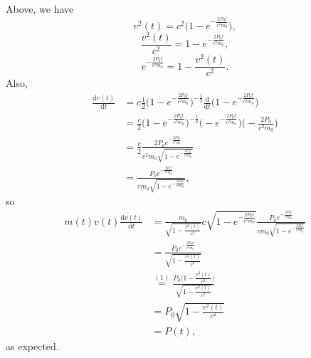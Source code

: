 \documentclass[12pt]{article}
\newcommand{\dd}{\mathrm{d}}
\begin{document}
Above, we have
\[
v^2(t) = c^2\Bigg( 1 - e^{-\frac{2P_0 t}{c^2 m_0}} \Bigg),
\]
\[
\frac{v^2(t)}{c^2} = 1 - e^{-\frac{2P_0 t}{c^2 m_0}}, 
\]
\begin{equation}
e^{-\frac{2P_0 t}{c^2 m_0}} = 1 - \frac{v^2(t)}{c^2}.
\end{equation}
Also,
\begin{align*}
\frac{\dd v(t)}{\dd t} &= c\frac{1}{2} \Bigg( 1 - e^{-\frac{2P_0 t}{c^2 m_0}}\Bigg)^{-\frac{1}{2}} \frac{\dd}{\dd t}\Bigg( 1 - e^{-\frac{2P_0 t}{c^2 m_0}}\Bigg) \\
							  &= \frac{c}{2} \Bigg( 1 - e^{-\frac{2P_0 t}{c^2 m_0}}\Bigg)^{-\frac{1}{2}} \Bigg( -e^{-\frac{2P_0 t}{c^2 m_0}} \Bigg) \Bigg( -\frac{2P_0}{c^2 m_0} \Bigg) \\
							  &= \frac{c}{2} \frac{2P_0 e^{-\frac{2P_0 t}{c^2 m_0}}}{c^2 m_0\sqrt{1 - e^{-\frac{2P_0 t}{c^2 m_0}}}} \\
							  &= \frac{P_0e^{-\frac{2P_0 t}{c^2 m_0}}}{cm_0\sqrt{1 - e^{-\frac{2	P_0t}{c^2 m_0}}}},
\end{align*}
so 
\begin{align*}
m(t)v(t) \frac{\dd v(t)}{\dd t} &= \frac{m_0}{\sqrt{1 - \frac{v^2(t)}{c^2}}} c \sqrt{1 - e^{- \frac{2P_0 t}{c^2 m_0}}} \frac{P_0 e^{-\frac{2P_0 t}{c^2 m_0}}}{cm_0 \sqrt{1 - e^{- \frac{2P_0 t}{c^2 m_0}}}} \\
										     &= \frac{P_0e^{-\frac{2P_0t}{c^2m_0}}}{\sqrt{1 - \frac{v^2(t)}{c^2}}} \\
										     &\overset{(1)}{=} \frac{P_0\Bigg( 1 - \frac{v^2(t)}{c^2} \Bigg)}{\sqrt{1 - \frac{v^2(t)}{c^2}}} \\
										     &= P_0 \sqrt{1 - \frac{v^2(t)}{c^2}} \\
										     &= P(t),
\end{align*}
as expected.
\end{document}

